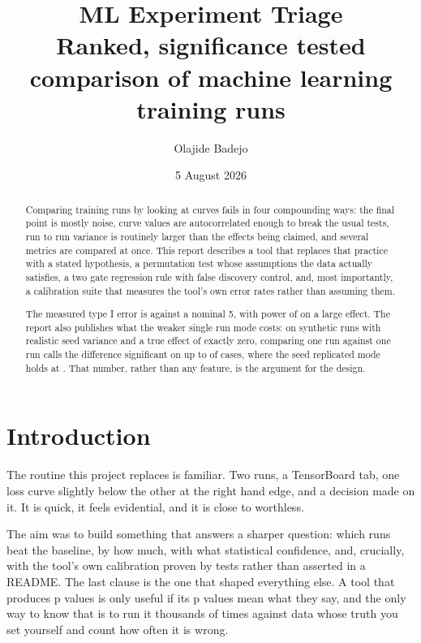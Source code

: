 \documentclass[11pt,a4paper]{report}
\title{\textbf{ML Experiment Triage}\\[0.4em]
\large Ranked, significance tested comparison of machine learning training runs}
\author{Olajide Badejo}
\date{5 August 2026}
\begin{document}
\maketitle

\begin{abstract}
\noindent
Comparing training runs by looking at curves fails in four compounding ways: the
final point is mostly noise, curve values are autocorrelated enough to break the
usual tests, run to run variance is routinely larger than the effects being
claimed, and several metrics are compared at once. This report describes a tool
that replaces that practice with a stated hypothesis, a permutation test whose
assumptions the data actually satisfies, a two gate regression rule with false
discovery control, and, most importantly, a calibration suite that measures the
tool's own error rates rather than assuming them.

The measured type I error is \facttypeonestrong{} against a nominal 5, with
power of \factpowerstrong{} on a large effect. The report also publishes what the
weaker single run mode costs: on synthetic runs with realistic seed variance and
a true effect of exactly zero, comparing one run against one run calls the
difference significant on up to \factweakmodeworst{} of cases, where the seed
replicated mode holds at \factstrongmodeunderseedvariance{}. That number, rather
than any feature, is the argument for the design.
\end{abstract}

{\setlength{\parskip}{0pt}\tableofcontents}

\chapter{Introduction}

The routine this project replaces is familiar. Two runs, a TensorBoard tab, one
loss curve slightly below the other at the right hand edge, and a decision made
on it. It is quick, it feels evidential, and it is close to worthless.

The aim was to build something that answers a sharper question: which runs beat
the baseline, by how much, with what statistical confidence, and, crucially,
with the tool's own calibration proven by tests rather than asserted in a README.
The last clause is the one that shaped everything else. A tool that produces p
values is only useful if its p values mean what they say, and the only way to
know that is to run it thousands of times against data whose truth you set
yourself and count how often it is wrong.
\end{document}

